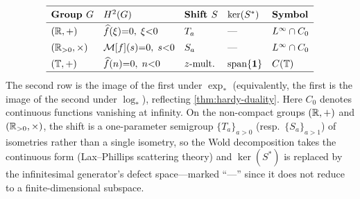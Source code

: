 \begin{example}\label{ex:hardy-summary}
{\small
\[
\renewcommand{\arraystretch}{1.4}
\begin{array}{lllll}
\hline
\textbf{Group } G & \Htwo(G) & \textbf{Shift } S & \ker(S^*) & \textbf{Symbol} \\
\hline
(\R, +) & \widehat{f}(\xi){=}0,\; \xi{<}0 & T_a & \text{---} & L^\infty \cap C_0 \\
(\Rpos, \times) & \cM[f](s){=}0,\; s{<}0 & S_a & \text{---} & L^\infty \cap C_0 \\
(\bT, +) & \widehat{f}(n){=}0,\; n{<}0 & z\text{-mult.} & \mathrm{span}\{\mathbf{1}\} & C(\bT) \\
\hline
\end{array}
\]
}The second row is the image of the first under $\exp_*$ (equivalently, the first is the image of the second under $\log_*$), reflecting \cref{thm:hardy-duality}. Here $C_0$ denotes continuous functions vanishing at infinity. On the non-compact groups $(\mathbb{R}, +)$ and $(\mathbb{R}_{>0}, \times)$, the shift is a one-parameter semigroup $\{T_a\}_{a > 0}$ (resp.\ $\{S_a\}_{a > 1}$) of isometries rather than a single isometry, so the Wold decomposition takes the continuous form (Lax--Phillips scattering theory) and $\ker(S^*)$ is replaced by the infinitesimal generator's defect space---marked ``---'' since it does not reduce to a finite-dimensional subspace.
\end{example}

